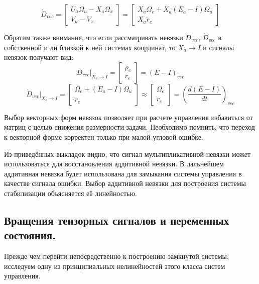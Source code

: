 \documentclass[a4paper]{article}
\begin{document}
\begin{equation}\dot{D}_{vec} = \begin{bmatrix}U_a\Omega_u-X_a\Omega_x\\ V_u-V_x\end{bmatrix}=\begin{bmatrix}X_a\Omega_e + X_a(E_a-I)\Omega_u\\ X_a\dot{r}_e\end{bmatrix}\end{equation}

Обратим также внимание, что если рассматривать невязки $D_{vec}$, $\dot{D}_{vec}$ в собственной и ли близкой к ней системах координат, то $X_a\rightarrow I$ и сигналы невязок получают вид:
\begin{equation} \label{simpl1} D_{vec}|_{X_a\rightarrow I} = \begin{bmatrix}\rho_e\\r_e\end{bmatrix} = (E-I)_{vec} \end{equation}
\begin{equation} \label{simpl2}\dot{D}_{vec}|_{X_a\rightarrow I} = \begin{bmatrix}\Omega_e + (E_a-I)\Omega_u\\ \dot{r}_e\end{bmatrix}\approx\begin{bmatrix}\Omega_e\\ \dot{r}_e\end{bmatrix} = \left(\frac{d(E-I)}{dt}\right)_{vec}
\end{equation}

Выбор векторных форм невязок позволяет при расчете управления избавиться от матриц с целью снижения размерности задачи. Необходимо помнить, что переход к векторной форме корректен только при малой угловой ошибке.

Из приведённых выкладок видно, что сигнал мультипликативной невязки может использоваться для восстановления аддитивной невязки. В дальнейшем аддитивная невязка будет использована для замыкания системы управления в качестве сигнала ошибки. Выбор аддитивной невязки для построения системы стабилизации объясняется её линейностью.

\subsection{Вращения тензорных сигналов и переменных состояния.}
Прежде чем перейти непосредственно к построению замкнутой системы, исследуем одну из принципиальных нелинейностей этого класса систем управления.
\end{document}
